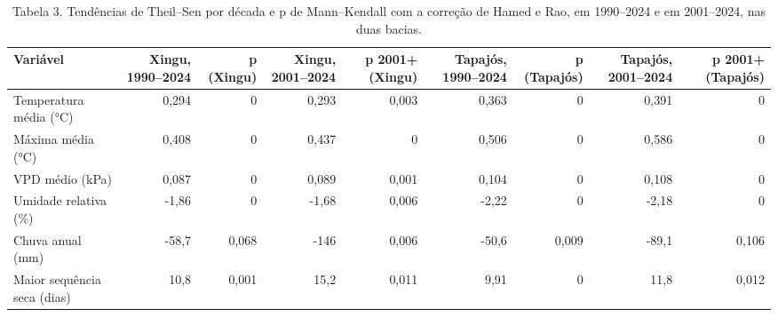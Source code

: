 \begin{table}
\caption{Tabela 3. Tendências de Theil–Sen por década e p de Mann–Kendall com a correção de Hamed e Rao, em 1990–2024 e em 2001–2024, nas duas bacias.}
\label{tab:03_clima::tendencias}
\begin{tabular}{lrrrrrrrr}
\toprule
Variável & Xingu, 1990–2024 & p (Xingu) & Xingu, 2001–2024 & p 2001+ (Xingu) & Tapajós, 1990–2024 & p (Tapajós) & Tapajós, 2001–2024 & p 2001+ (Tapajós) \\
\midrule
Temperatura média (°C) & 0,294 & 0 & 0,293 & 0,003 & 0,363 & 0 & 0,391 & 0 \\
Máxima média (°C) & 0,408 & 0 & 0,437 & 0 & 0,506 & 0 & 0,586 & 0 \\
VPD médio (kPa) & 0,087 & 0 & 0,089 & 0,001 & 0,104 & 0 & 0,108 & 0 \\
Umidade relativa (\%) & -1,86 & 0 & -1,68 & 0,006 & -2,22 & 0 & -2,18 & 0 \\
Chuva anual (mm) & -58,7 & 0,068 & -146 & 0,006 & -50,6 & 0,009 & -89,1 & 0,106 \\
Maior sequência seca (dias) & 10,8 & 0,001 & 15,2 & 0,011 & 9,91 & 0 & 11,8 & 0,012 \\
\bottomrule
\end{tabular}
\end{table}
